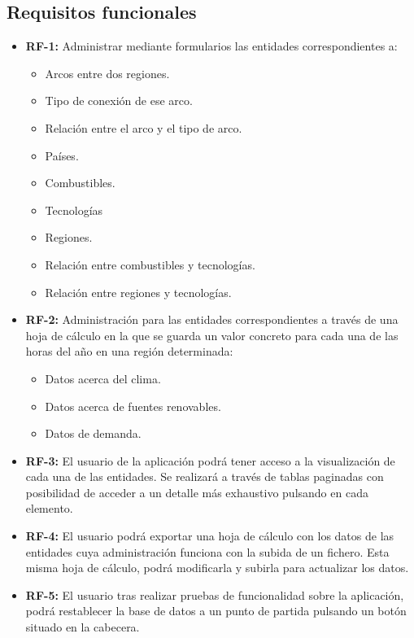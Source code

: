 \subsection{Requisitos funcionales}

\begin{itemize}
	
	\item \textbf{RF-1:} Administrar mediante formularios las entidades correspondientes a: 

		\begin{itemize}
			
			\item Arcos entre dos regiones.
			\item Tipo de conexión de ese arco.
			\item Relación entre el arco y el tipo de arco.
			\item Países.
			\item Combustibles.
			\item Tecnologías
			\item Regiones.
			\item Relación entre combustibles y tecnologías.
			\item Relación entre regiones y tecnologías.
			
		\end{itemize}
	
	\item \textbf{RF-2:} Administración para las entidades correspondientes a través de una hoja de cálculo en la que se guarda un valor concreto para cada una de las horas del año en una región determinada:
	
		\begin{itemize}
			
			\item Datos acerca del clima.
			\item Datos acerca de fuentes renovables.
			\item Datos de demanda.
			
		\end{itemize}
	
	\item \textbf{RF-3:} El usuario de la aplicación podrá tener acceso a la visualización de cada una de las entidades. Se realizará a través de tablas paginadas con posibilidad de acceder a un detalle más exhaustivo pulsando en cada elemento.
	
	\item \textbf{RF-4:} El usuario podrá exportar una hoja de cálculo con los datos de las entidades cuya administración funciona con la subida de un fichero. Esta misma hoja de cálculo, podrá modificarla y subirla para actualizar los datos.
	
	\item \textbf{RF-5:} El usuario tras realizar pruebas de funcionalidad sobre la aplicación, podrá restablecer la base de datos a un punto de partida pulsando un botón situado en la cabecera.
	
\end{itemize}

